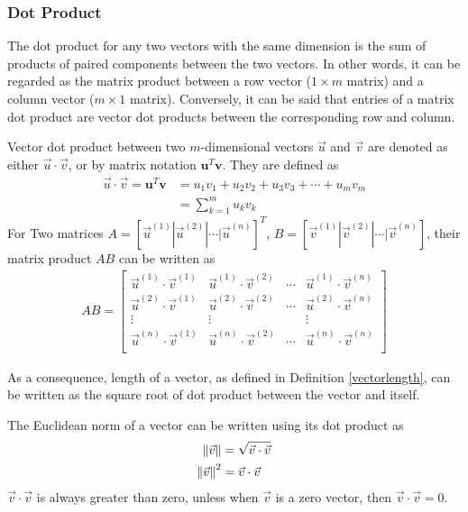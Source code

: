 \subsubsection{Dot Product}
The dot product for any two vectors with the same dimension is the sum of products of paired components between the two vectors. In other words, it can be regarded as the matrix product between a row vector ($1 \times m$ matrix) and a column vector ($m \times 1$ matrix). Conversely, it can be said that entries of a matrix dot product are vector dot products between the corresponding row and column.
\begin{defn}
\label{dotreal}
Vector dot product between two $m$-dimensional vectors $\vec{u}$ and $\vec{v}$ are denoted as either $\vec{u} \cdot \vec{v}$, or by matrix notation $\textbf{u}^T\textbf{v}$. They are defined as
\begin{align*}
\vec{u} \cdot \vec{v} = \textbf{u}^T\textbf{v} &= u_1v_1 + u_2v_2 + u_3v_3 + \cdots + u_mv_m \\
&= \sum_{k=1}^{m} u_kv_k
\end{align*}
For Two matrices 
$A = [\vec{u}^{(1)}|\vec{u}^{(2)}|\cdots|\vec{u}^{(n)}]^T$,
$B = [\vec{v}^{(1)}|\vec{v}^{(2)}|\cdots|\vec{v}^{(n)}]$, their matrix product $AB$ can be written as
\begin{align*}
AB =
\begin{bmatrix}
\vec{u}^{(1)} \cdot \vec{v}^{(1)} & \vec{u}^{(1)} \cdot \vec{v}^{(2)} & \cdots & \vec{u}^{(1)} \cdot \vec{v}^{(n)} \\
\vec{u}^{(2)} \cdot \vec{v}^{(1)} & \vec{u}^{(2)} \cdot \vec{v}^{(2)} & \cdots & \vec{u}^{(2)} \cdot \vec{v}^{(n)} \\
\vdots & \vdots & & \vdots \\
\vec{u}^{(n)} \cdot \vec{v}^{(1)} & \vec{u}^{(n)} \cdot \vec{v}^{(2)} & \cdots & \vec{u}^{(n)} \cdot \vec{v}^{(n)} \\
\end{bmatrix}
\end{align*}
\end{defn}
As a consequence, length of a vector, as defined in Definition \ref{vectorlength}, can be written as the square root of dot product between the vector and itself.
\begin{proper}
\label{normpos}
The Euclidean norm of a vector can be written using its dot product as
\begin{align*}
\norm{\vec{v}} &= \sqrt{\vec{v} \cdot \vec{v}}\\
\norm{\vec{v}}^2 &= \vec{v} \cdot \vec{v}
\end{align*}
$\vec{v} \cdot \vec{v}$ is always greater than zero, unless when $\vec{v}$ is a zero vector, then $\vec{v} \cdot \vec{v} = 0$.
\end{proper}

